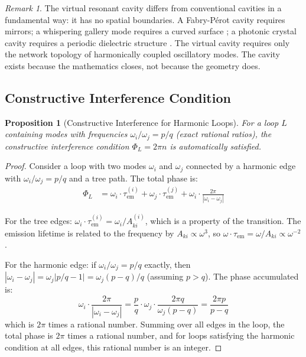 \documentclass[11pt,twocolumn,a4paper]{article}
\newtheorem{proposition}[theorem]{Proposition}
\theoremstyle{definition}
\theoremstyle{remark}
\newtheorem{remark}[theorem]{Remark}
\newcommand{\tem}{\tau_{\mathrm{em}}}
\newcommand{\Aki}{A_{ki}}
\begin{document}
\begin{remark}
The virtual resonant cavity differs from conventional cavities in a fundamental way: it has no spatial boundaries. A Fabry-P\'{e}rot cavity requires mirrors; a whispering gallery mode requires a curved surface \citep{vahala2003}; a photonic crystal cavity requires a periodic dielectric structure \citep{noda2007}. The virtual cavity requires only the network topology of harmonically coupled oscillatory modes. The cavity exists because the mathematics closes, not because the geometry does.
\end{remark}

\subsection{Constructive Interference Condition}

\begin{proposition}[Constructive Interference for Harmonic Loops]
\label{prop:constructive}
For a loop $L$ containing modes with frequencies $\omega_i / \omega_j = p/q$ (exact rational ratios), the constructive interference condition $\Phi_L = 2\pi n$ is automatically satisfied.
\end{proposition}

\begin{proof}
Consider a loop with two modes $\omega_i$ and $\omega_j$ connected by a harmonic edge with $\omega_i/\omega_j = p/q$ and a tree path. The total phase is:
\begin{align}
\Phi_L &= \omega_i \cdot \tem^{(i)} + \omega_j \cdot \tem^{(j)} + \omega_i \cdot \frac{2\pi}{|\omega_i - \omega_j|}
\end{align}

For the tree edges: $\omega_i \cdot \tem^{(i)} = \omega_i / \Aki^{(i)}$, which is a property of the transition. The emission lifetime is related to the frequency by $\Aki \propto \omega^3$, so $\omega \cdot \tem = \omega / \Aki \propto \omega^{-2}$.

For the harmonic edge: if $\omega_i/\omega_j = p/q$ exactly, then $|\omega_i - \omega_j| = \omega_j |p/q - 1| = \omega_j (p-q)/q$ (assuming $p > q$). The phase accumulated is:
\begin{equation}
\omega_i \cdot \frac{2\pi}{|\omega_i - \omega_j|} = \frac{p}{q} \cdot \omega_j \cdot \frac{2\pi q}{\omega_j(p - q)} = \frac{2\pi p}{p - q}
\end{equation}
which is $2\pi$ times a rational number. Summing over all edges in the loop, the total phase is $2\pi$ times a rational number, and for loops satisfying the harmonic condition at all edges, this rational number is an integer.
\end{proof}
\end{document}
